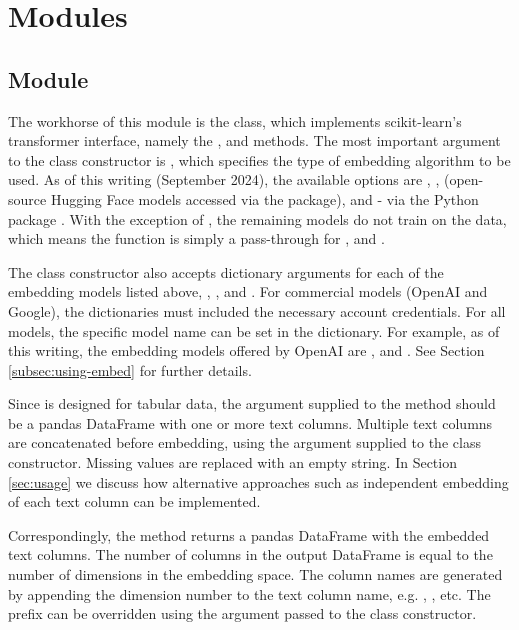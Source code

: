 \documentclass[article]{jss}
\begin{document}
\section[TabuLLM Modules]{ Modules}\label{sec:modules}

\subsection[embed Module]{ Module}\label{subsec:module-embed}

The workhorse of this module is the  class, which implements scikit-learn's transformer interface, namely the ,  and  methods. The most important argument to the class constructor is , which specifies the type of embedding algorithm to be used. As of this writing (September 2024), the available options are , ,  (open-source Hugging Face models accessed via the  package), and  - via the  Python package \citep{rehurek_lrec}. With the exception of , the remaining models do not train on the data, which means the  function is simply a pass-through for ,  and .

The class constructor also accepts dictionary arguments for each of the embedding models listed above, , ,  and . For commercial models (OpenAI and Google), the dictionaries must included the necessary account credentials. For all models, the specific model name can be set in the dictionary. For example, as of this writing, the embedding models offered by OpenAI are ,  and . See Section \ref{subsec:using-embed} for further details.

Since  is designed for tabular data, the  argument supplied to the  method should be a pandas DataFrame with one or more text columns. Multiple text columns are concatenated before embedding, using the  argument supplied to the class constructor. Missing values are replaced with an empty string. In Section \ref{sec:usage} we discuss how alternative approaches such as independent embedding of each text column can be implemented.

Correspondingly, the  method returns a pandas DataFrame with the embedded text columns. The number of columns in the output DataFrame is equal to the number of dimensions in the embedding space. The column names are generated by appending the dimension number to the text column name, e.g. , , etc. The prefix can be overridden using the  argument passed to the class constructor.
\end{document}
